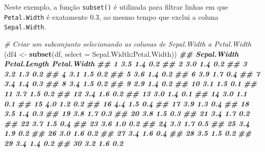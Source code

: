 \documentclass[
]{book}
\newenvironment{Shaded}{\begin{snugshade}}{\end{snugshade}}
\newcommand{\AttributeTok}[1]{\textcolor[rgb]{0.13,0.29,0.53}{#1}}
\newcommand{\CommentTok}[1]{\textcolor[rgb]{0.56,0.35,0.01}{\textit{#1}}}
\newcommand{\DocumentationTok}[1]{\textcolor[rgb]{0.56,0.35,0.01}{\textbf{\textit{#1}}}}
\newcommand{\FunctionTok}[1]{\textcolor[rgb]{0.13,0.29,0.53}{\textbf{#1}}}
\newcommand{\NormalTok}[1]{#1}
\newcommand{\OtherTok}[1]{\textcolor[rgb]{0.56,0.35,0.01}{#1}}
\newcommand{\SpecialCharTok}[1]{\textcolor[rgb]{0.81,0.36,0.00}{\textbf{#1}}}
\begin{document}
Neste exemplo, a função \texttt{subset()} é utilizada para filtrar linhas em
que \texttt{Petal.Width} é exatamente 0.3, ao mesmo tempo que exclui a coluna
\texttt{Sepal.Width}.

\begin{Shaded}
\begin{Highlighting}[]
\CommentTok{\# Criar um subconjunto selecionando as colunas de Sepal.Width a Petal.Width}
\NormalTok{(df4 }\OtherTok{\textless{}{-}} \FunctionTok{subset}\NormalTok{(df, }\AttributeTok{select =}\NormalTok{ Sepal.Width}\SpecialCharTok{:}\NormalTok{Petal.Width))}
\DocumentationTok{\#\#     Sepal.Width Petal.Length Petal.Width}
\DocumentationTok{\#\# 1           3.5          1.4         0.2}
\DocumentationTok{\#\# 2           3.0          1.4         0.2}
\DocumentationTok{\#\# 3           3.2          1.3         0.2}
\DocumentationTok{\#\# 4           3.1          1.5         0.2}
\DocumentationTok{\#\# 5           3.6          1.4         0.2}
\DocumentationTok{\#\# 6           3.9          1.7         0.4}
\DocumentationTok{\#\# 7           3.4          1.4         0.3}
\DocumentationTok{\#\# 8           3.4          1.5         0.2}
\DocumentationTok{\#\# 9           2.9          1.4         0.2}
\DocumentationTok{\#\# 10          3.1          1.5         0.1}
\DocumentationTok{\#\# 11          3.7          1.5         0.2}
\DocumentationTok{\#\# 12          3.4          1.6         0.2}
\DocumentationTok{\#\# 13          3.0          1.4         0.1}
\DocumentationTok{\#\# 14          3.0          1.1         0.1}
\DocumentationTok{\#\# 15          4.0          1.2         0.2}
\DocumentationTok{\#\# 16          4.4          1.5         0.4}
\DocumentationTok{\#\# 17          3.9          1.3         0.4}
\DocumentationTok{\#\# 18          3.5          1.4         0.3}
\DocumentationTok{\#\# 19          3.8          1.7         0.3}
\DocumentationTok{\#\# 20          3.8          1.5         0.3}
\DocumentationTok{\#\# 21          3.4          1.7         0.2}
\DocumentationTok{\#\# 22          3.7          1.5         0.4}
\DocumentationTok{\#\# 23          3.6          1.0         0.2}
\DocumentationTok{\#\# 24          3.3          1.7         0.5}
\DocumentationTok{\#\# 25          3.4          1.9         0.2}
\DocumentationTok{\#\# 26          3.0          1.6         0.2}
\DocumentationTok{\#\# 27          3.4          1.6         0.4}
\DocumentationTok{\#\# 28          3.5          1.5         0.2}
\DocumentationTok{\#\# 29          3.4          1.4         0.2}
\DocumentationTok{\#\# 30          3.2          1.6         0.2}

\end{Highlighting}
\end{Shaded}
\end{document}
